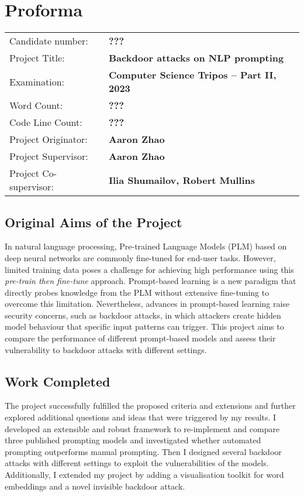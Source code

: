 \documentclass[12pt,a4paper,twoside,openright]{report}
\begin{document}
\chapter*{Proforma}
 {\large
  \begin{tabular}{ll}
	  Candidate number:   & \bf ???                                      \\
	  Project Title:      & \bf Backdoor attacks on NLP prompting        \\
	  Examination:        & \bf Computer Science Tripos -- Part II, 2023 \\
	  Word Count:         & \bf ??? \footnotemark[1]                     \\
	  Code Line Count:    & \bf ??? \footnotemark[2]                     \\
	  Project Originator: & \bf Aaron Zhao                  \\
	  Project Supervisor: & \bf Aaron Zhao                       \\
	  Project Co-supervisor: & \bf Ilia Shumailov, Robert Mullins \\
  \end{tabular}
 }

\section*{Original Aims of the Project}
In natural language processing, Pre-trained Language Models (PLM) based on deep neural networks are commonly fine-tuned for end-user tasks. However, limited training data poses a challenge for achieving high performance using this \emph{pre-train then fine-tune} approach. Prompt-based learning is a new paradigm that directly probes knowledge from the PLM without extensive fine-tuning to overcome this limitation. Nevertheless, advances in prompt-based learning raise security concerns, such as backdoor attacks, in which attackers create hidden model behaviour that specific input patterns can trigger. This project aims to compare the performance of different prompt-based models and assess their vulnerability to backdoor attacks with different settings.

\section*{Work Completed}
The project successfully fulfilled the proposed criteria and extensions and further explored additional questions and ideas that were triggered by my results. I developed an extensible and robust framework to re-implement and compare three published prompting models and investigated whether automated prompting outperforms manual prompting. Then I designed several backdoor attacks with different settings to exploit the vulnerabilities of the models. Additionally, I extended my project by adding a visualisation toolkit for word embeddings and a novel invisible backdoor attack.
\end{document}
